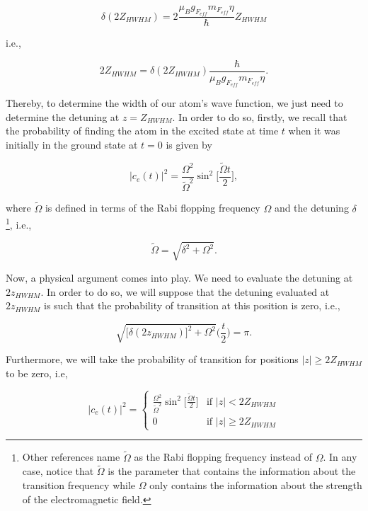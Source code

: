 \documentclass{article}
\begin{document}
\begin{equation}
  \delta (2Z_{HWHM}) = 2\frac{\mu_{B} g_{F_{eff}} m_{F_{eff}} \eta}{\hbar} Z_{HWHM}
\end{equation}

i.e.,

\begin{equation}\label{position_at_zhwhm}
  2Z_{HWHM} = \delta (2Z_{HWHM}) \frac{\hbar}{\mu_{B} g_{F_{eff}} m_{F_{eff}} \eta}.
\end{equation}

Thereby, to determine the width of our atom's wave function, we just need to determine the detuning at $z = Z_{HWHM}$. In order to do so, firstly, we recall that the probability of finding the atom in the excited state at time $t$ when it was initially in the ground state at $t=0$ is given by

\begin{equation}\label{rabi_oscillations_exact}
  |c_{e}(t)|^{2} =\frac{\Omega^{2}}{\tilde{\Omega}^{2}} \sin^{2}\bigg[\frac{\tilde{\Omega} t}{2} \bigg],
\end{equation}

where $\tilde{\Omega}$ is defined in terms of the Rabi flopping frequency $\Omega$ and the detuning $\delta$\footnote{Other references name $\tilde{\Omega}$ as the Rabi flopping frequency instead of $\Omega$. In any case, notice that $\tilde{\Omega}$ is the parameter that contains the information about the transition frequency while $\Omega$ only contains the information about the strength of the electromagnetic field.}, i.e.,

\begin{equation}\label{omega_tilde_definition}
  \tilde{\Omega} = \sqrt{\delta^{2} + \Omega^{2}}.
\end{equation}

Now, a physical argument comes into play. We need to evaluate the detuning at $2z_{HWHM}$. In order to do so, we will suppose that the detuning evaluated at $2z_{HWHM}$ is such that the probability of transition at this position  is zero, i.e.,

\begin{equation}\label{detuning_condition}
\sqrt{\big[ \delta (2z_{HWHM}) \big]^{2} + \Omega^{2}} \bigg( \frac{t}{2} \bigg) = \pi.
\end{equation}

Furthermore, we will take the probability of transition for positions $|z| \ge 2 Z_{HWHM}$ to be zero, i.e,

\begin{equation}\label{position_condition}
|c_{e}(t)|^{2} =
    \begin{cases}
        \frac{\Omega^{2}}{\tilde{\Omega}^{2}} \sin^{2}\bigg[\frac{\tilde{\Omega} t}{2} \bigg] & \text{if } |z| < 2 Z_{HWHM}\\
        0 & \text{if } |z| \ge 2 Z_{HWHM}
    \end{cases}
\end{equation}
\end{document}
